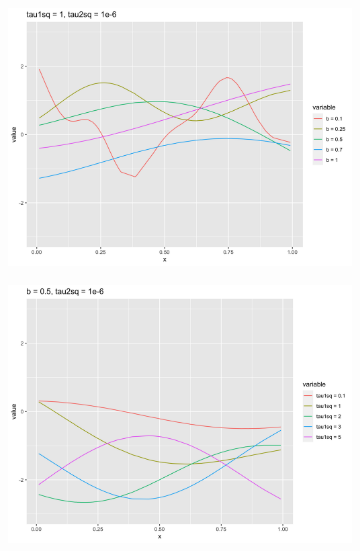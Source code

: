 \documentclass[11pt]{article}
\begin{document}
\begin{enumerate}[(A)]
\begin{figure}
    \centering
    \begin{subfigure}[t]{0.6\textwidth}
        \centering
        \includegraphics[width=\linewidth]{Ex6/figures/GP_bseq.png} 
    \end{subfigure}
    \begin{subfigure}[t]{0.6\textwidth}
        \centering
        \includegraphics[width=\linewidth]{Ex6/figures/GP_tau1sq_seq.png} 
    \end{subfigure}
    \centering
    \begin{subfigure}[t]{0.6\textwidth}
        \centering

\end{subfigure}
\end{figure}
\end{enumerate}
\end{document}
